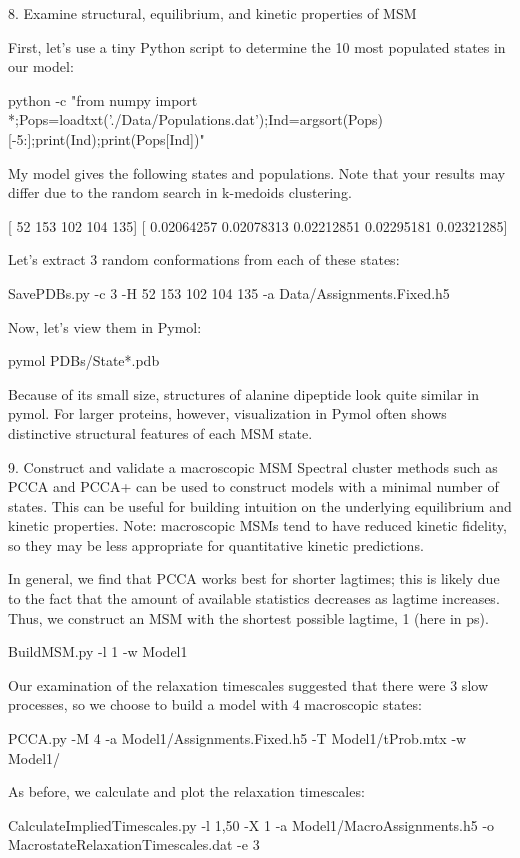 \documentclass[12pt]{article}
\begin{document}
8.  Examine structural, equilibrium, and kinetic properties of MSM

First, let’s use a tiny Python script to determine the 10 most populated states in our model:

python -c "from numpy import *;Pops=loadtxt('./Data/Populations.dat');Ind=argsort(Pops)[-5:];print(Ind);print(Pops[Ind])"

My model gives the following states and populations.  Note that your results may differ due to the random search in k-medoids clustering. 

[ 52 153 102 104 135]
[ 0.02064257  0.02078313  0.02212851  0.02295181  0.02321285]

Let’s extract 3 random conformations from each of these states:

SavePDBs.py -c 3 -H  52 153 102 104 135 -a Data/Assignments.Fixed.h5

Now, let’s view them in Pymol:

pymol PDBs/State*.pdb

Because of its small size, structures of alanine dipeptide look quite similar in pymol.  For larger proteins, however, visualization in Pymol often shows distinctive structural features of each MSM state.  

9.  Construct and validate a macroscopic MSM
Spectral cluster methods such as PCCA and PCCA+ can be used to construct models with a minimal number of states.  This can be useful for building intuition on the underlying equilibrium and kinetic properties.  
Note: macroscopic MSMs tend to have reduced kinetic fidelity, so they may be less appropriate for quantitative kinetic predictions.  

In general, we find that PCCA works best for shorter lagtimes; this is likely due to the fact that the amount of available statistics decreases as lagtime increases.  Thus, we construct an MSM with the shortest possible lagtime, 1 (here in ps).

BuildMSM.py -l 1 -w Model1

Our examination of the relaxation timescales suggested that there were 3 slow processes, so we choose to build a model with 4 macroscopic states:

PCCA.py -M 4 -a Model1/Assignments.Fixed.h5 -T Model1/tProb.mtx -w Model1/

As before, we calculate and plot the relaxation timescales:

CalculateImpliedTimescales.py -l 1,50 -X 1 -a Model1/MacroAssignments.h5 -o MacrostateRelaxationTimescales.dat -e 3
\end{document}

